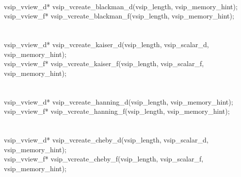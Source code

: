 \\\cvsiplh\\
\begin{cfuncs}
\\ \hline
vsip\_vview\_d* vsip\_vcreate\_blackman\_d(vsip\_length, vsip\_memory\_hint);\\
vsip\_vview\_f* vsip\_vcreate\_blackman\_f(vsip\_length, vsip\_memory\_hint);\\
\\
\\ \hline
vsip\_vview\_d* vsip\_vcreate\_kaiser\_d(vsip\_length, vsip\_scalar\_d, vsip\_memory\_hint);\\
vsip\_vview\_f* vsip\_vcreate\_kaiser\_f(vsip\_length, vsip\_scalar\_f,  vsip\_memory\_hint);\\
\\
\\ \hline
vsip\_vview\_d* vsip\_vcreate\_hanning\_d(vsip\_length, vsip\_memory\_hint);\\
vsip\_vview\_f* vsip\_vcreate\_hanning\_f(vsip\_length, vsip\_memory\_hint);\\
\\
\\ \hline
vsip\_vview\_d* vsip\_vcreate\_cheby\_d(vsip\_length, vsip\_scalar\_d, vsip\_memory\_hint);\\
vsip\_vview\_f* vsip\_vcreate\_cheby\_f(vsip\_length, vsip\_scalar\_f, vsip\_memory\_hint);\\
\end{cfuncs}
\pyjvsiph

